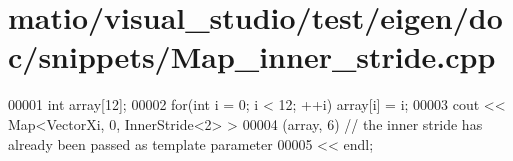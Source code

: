 \hypertarget{matio_2visual__studio_2test_2eigen_2doc_2snippets_2_map__inner__stride_8cpp_source}{}\section{matio/visual\+\_\+studio/test/eigen/doc/snippets/\+Map\+\_\+inner\+\_\+stride.cpp}
\label{matio_2visual__studio_2test_2eigen_2doc_2snippets_2_map__inner__stride_8cpp_source}

\begin{DoxyCode}
00001 \textcolor{keywordtype}{int} array[12];
00002 \textcolor{keywordflow}{for}(\textcolor{keywordtype}{int} i = 0; i < 12; ++i) array[i] = i;
00003 cout << Map<VectorXi, 0, InnerStride<2> >
00004          (array, 6) \textcolor{comment}{// the inner stride has already been passed as template parameter}
00005      << endl;
\end{DoxyCode}
